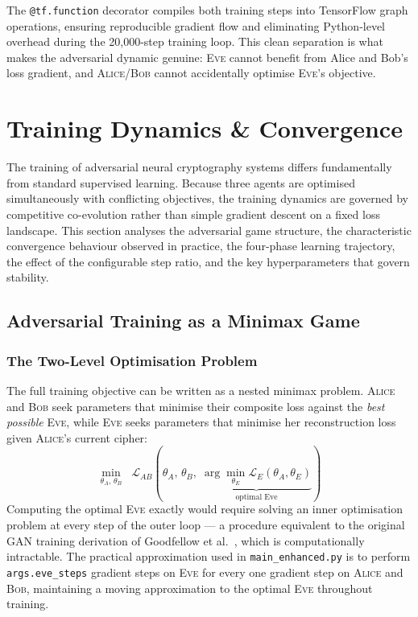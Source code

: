 \documentclass[12pt, a4paper]{article}
\newcommand{\alice}{\textsc{Alice}}
\newcommand{\bob}{\textsc{Bob}}
\newcommand{\eve}{\textsc{Eve}}
\newcommand{\thetaA}{\theta_{\!A}}
\newcommand{\thetaB}{\theta_{\!B}}
\newcommand{\thetaE}{\theta_{\!E}}
\newcommand{\code}[1]{\texttt{\color{CodeRed}#1}}
\begin{document}
The \code{@tf.function} decorator compiles both training steps into
TensorFlow graph operations, ensuring reproducible gradient flow and
eliminating Python-level overhead during the 20{,}000-step training loop.
This clean separation is what makes the adversarial dynamic genuine:
\eve{} cannot benefit from Alice and Bob's loss gradient, and
\alice{}/\bob{} cannot accidentally optimise \eve{}'s objective.


\newpage
\section{Training Dynamics \& Convergence}
\label{sec:training_dynamics}

The training of adversarial neural cryptography systems differs fundamentally
from standard supervised learning. Because three agents are optimised
simultaneously with conflicting objectives, the training dynamics are
governed by competitive co-evolution rather than simple gradient descent
on a fixed loss landscape. This section analyses the adversarial game
structure, the characteristic convergence behaviour observed in practice,
the four-phase learning trajectory, the effect of the configurable step
ratio, and the key hyperparameters that govern stability.

\subsection{Adversarial Training as a Minimax Game}
\label{subsec:minimax_game}

\subsubsection*{The Two-Level Optimisation Problem}

The full training objective can be written as a nested minimax problem.
\alice{} and \bob{} seek parameters that minimise their composite loss
against the \emph{best possible} \eve{}, while \eve{} seeks parameters
that minimise her reconstruction loss given \alice{}'s current cipher:
%
\begin{equation}
  \min_{\thetaA,\,\thetaB} \;\;
  \mathcal{L}_{AB}\!\left(
    \thetaA,\, \thetaB,\;
    \underbrace{\arg\min_{\thetaE} \mathcal{L}_E(\thetaA, \thetaE)}_{\text{optimal Eve}}
  \right)
  \label{eq:nested_minimax}
\end{equation}
%
Computing the optimal \eve{} exactly would require solving an inner
optimisation problem at every step of the outer loop --- a procedure
equivalent to the original GAN training derivation of Goodfellow et
al.~\cite{goodfellow2014generative}, which is computationally intractable.
The practical approximation used in \code{main\_enhanced.py} is to perform
\code{args.eve\_steps} gradient steps on \eve{} for every one gradient step
on \alice{} and \bob{}, maintaining a moving approximation to the optimal
\eve{} throughout training.
\end{document}
